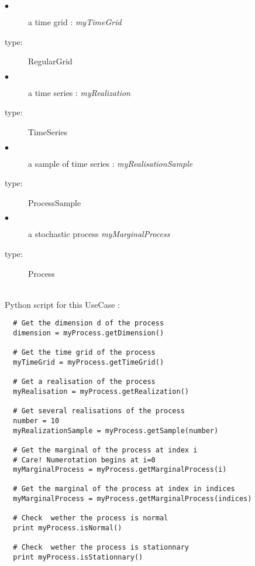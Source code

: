{
  \begin{description}
  \item[$\bullet$] a time grid : {\itshape myTimeGrid}
  \item[type:]  RegularGrid
  \end{description}

  \begin{description}
  \item[$\bullet$] a time series : {\itshape myRealization}
  \item[type:]  TimeSeries
  \end{description}

  \begin{description}
  \item[$\bullet$] a sample of time series : {\itshape myRealisationSample}
  \item[type:] ProcessSample
  \end{description}

  \begin{description}
  \item[$\bullet$] a stochastic process {\itshape myMarginalProcess}
  \item[type:]  Process
  \end{description}
}

\textspace\\
Python script for this UseCase :

\begin{lstlisting}
  # Get the dimension d of the process  
  dimension = myProcess.getDimension()

  # Get the time grid of the process
  myTimeGrid = myProcess.getTimeGrid()

  # Get a realisation of the process
  myRealisation = myProcess.getRealization()

  # Get several realisations of the process
  number = 10
  myRealizationSample = myProcess.getSample(number)

  # Get the marginal of the process at index i
  # Care! Numerotation begins at i=0
  myMarginalProcess = myProcess.getMarginalProcess(i)

  # Get the marginal of the process at index in indices
  myMarginalProcess = myProcess.getMarginalProcess(indices)

  # Check  wether the process is normal
  print myProcess.isNormal()

  # Check  wether the process is stationnary
  print myProcess.isStationnary()
\end{lstlisting}
